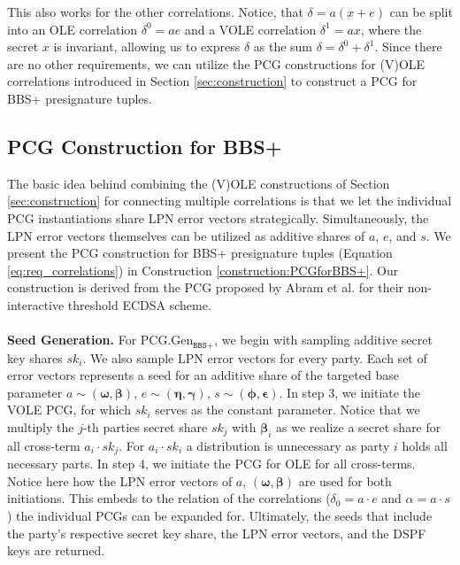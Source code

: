 This also works for the other correlations. Notice, that $\delta = a(x+e)$ can be split into an OLE correlation $\delta^0 = ae$ and a VOLE correlation $\delta^1 = ax$, where the secret $x$ is invariant, allowing us to express $\delta$ as the sum $\delta = \delta^0 + \delta^1$. Since there are no other requirements, we can utilize the PCG constructions for (V)OLE correlations introduced in Section \ref{sec:construction} to construct a PCG for BBS+ presignature tuples.

\subsection{PCG Construction for BBS+}
\label{subsec:pcgForBBs+}
The basic idea behind combining the (V)OLE constructions of Section \ref{sec:construction} for connecting multiple correlations is that we let the individual PCG instantiations share LPN error vectors strategically. Simultaneously, the LPN error vectors themselves can be utilized as additive shares of $a$, $e$, and $s$. We present the PCG construction for BBS+ presignature tuples (Equation \ref{eq:req_correlations}) in Construction \ref{construction:PCGforBBS+}. Our construction is derived from the PCG proposed by Abram et al. \cite{abram2022low} for their non-interactive threshold ECDSA scheme.
\\\\
\textbf{Seed Generation.} For PCG.Gen$_{\texttt{BBS+}}$, we begin with sampling additive secret key shares $sk_i$. We also sample LPN error vectors for every party. Each set of error vectors represents a seed for an additive share of the targeted base parameter $a \sim (\boldsymbol{\omega}, \boldsymbol{\beta})$, $e \sim (\boldsymbol{\eta}, \boldsymbol{\gamma})$, $s \sim (\boldsymbol{\phi}, \boldsymbol{\epsilon})$. In step 3, we initiate the VOLE PCG, for which $sk_i$ serves as the constant parameter. Notice that we multiply the $j$-th parties secret share $sk_j$ with $\boldsymbol{\beta}_i$ as we realize a secret share for all cross-term $a_i\cdot sk_j$. For $a_i\cdot sk_i$ a distribution is unnecessary as party $i$ holds all necessary parts. In step 4, we initiate the PCG for OLE for all cross-terms. Notice here how the LPN error vectors of $a$, $(\boldsymbol{\omega}, \boldsymbol{\beta})$ are used for both initiations. This embeds to the relation of the correlations ($\delta_0 = a\cdot e$ and $\alpha = a\cdot s$) the individual PCGs can be expanded for. Ultimately, the seeds that include the party's respective secret key share, the LPN error vectors, and the DSPF keys are returned.
